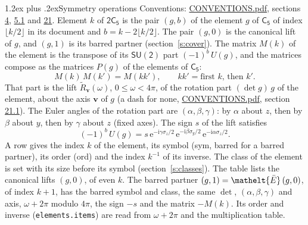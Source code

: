 \documentclass[10pt,a4paper]{article}
\makeatletter
\renewcommand\section{\@startsection{section}{1}{\z@}{-3ex plus -1ex minus -.2ex}%
  {1.2ex plus .2ex}{\normalfont\large\sffamily\bfseries\color{parttitle}}}
\numberwithin{equation}{section}
\newcommand{\eltfont}[1]{{\let\sigma\eltsigma\mathelt{#1}}}
\newcommand{\grp}[1]{\mathsf{#1}}
\newcommand{\elt}[1]{\eltfont{#1}}
\newcommand{\vv}{\mathbf{v}}
\newcommand{\iunit}{\mathrm{i}}
\newcommand{\expe}{\mathrm{e}}
\newcommand{\barred}[1]{\bar{#1}}
\newcommand{\lift}[1]{\tilde{#1}}
\newcommand{\pauli}[1]{\sigma_{#1}}
\makeatother
\begin{document}
\section{Symmetry operations}\label{s:elements}
Conventions: \href{../../CONVENTIONS.pdf}{CONVENTIONS.pdf}, sections \href{../../../rotation/CONVENTIONS.pdf\#conv.4}{4}, \href{../../../rotation/CONVENTIONS.pdf\#conv.5.1}{5.1} and \href{../../CONVENTIONS.pdf\#conv.21}{21}.
\leavevmode\label{n:index.element}\label{n:element.g}Element $k$ of $\grp{2C_{5}}$ is the pair $(g, b)$ of the element $g$ of \href{../../../rotation/data/pdf/C5.pdf}{$\grp{C_{5}}$} of index $\lfloor k/2\rfloor$ in its document and $b = k - 2\lfloor k/2\rfloor$. The pair $(g, 0)$ is the canonical lift of $g$, and $(g, 1)$ is its barred partner (section~\ref{s:cover}). \label{n:matrix.element.pin}\label{n:matrix.element}The matrix $M(k)$ of the element is the transpose of its $\grp{SU(2)}$ part $(-1)^{b}\,U(g)$, and the matrices compose as the matrices $P(g)$ of the elements of $\grp{C_{5}}$:
\begin{equation}\label{e:mprod}M(k)\,M(k') = M(kk'),\qquad kk' = \text{first } k\text{, then } k'.\end{equation}
\leavevmode\label{n:angle.omega}\label{n:vector.axis}\label{n:vector.pole}That part is the lift $\lift{R}_{\vv}(\omega)$, $0 \le \omega < 4\pi$, of the rotation part $(\det g)\,g$ of the element, about the axis $\vv$ of $g$ (a dash for none, \href{../../CONVENTIONS.pdf}{CONVENTIONS.pdf}, section \href{../../CONVENTIONS.pdf\#conv.21.1}{21.1}). \label{n:angle.euler.alpha}\label{n:angle.euler.beta}\label{n:angle.euler.gamma}\label{n:vector.coordinates}The Euler angles of the rotation part are $(\alpha,\beta,\gamma)$: by $\alpha$ about $z$, then by $\beta$ about $y$, then by $\gamma$ about $z$ (fixed axes). \label{n:local.euler.sign}The sign $s$ of the lift satisfies
\begin{equation}\label{e:euler}(-1)^{b}\,U(g) = s\,\expe^{-\iunit\gamma\pauli{z}/2}\,\expe^{-\iunit\beta\pauli{y}/2}\,\expe^{-\iunit\alpha\pauli{z}/2}.\end{equation}
\leavevmode\label{n:index.element.inverse}\label{n:head.sym}\label{n:head.ord}A row gives the index $k$ of the element, its symbol (sym, barred for a barred partner), its order (ord) and the index $k^{-1}$ of its inverse. \label{n:head.class}The class of the element is set with its size before its symbol (section~\ref{s:classes}).
The table lists the canonical lifts $(g, 0)$, of even $k$. The barred partner $(g, 1) = \elt{\barred{E}}\,(g, 0)$, of index $k + 1$, has the barred symbol and class, the same $\det$, $(\alpha,\beta,\gamma)$ and axis, $\omega + 2\pi$ modulo $4\pi$, the sign $-s$ and the matrix $-M(k)$. Its order and inverse (\texttt{elements.items}) are read from $\omega + 2\pi$ and the multiplication table.
\end{document}
